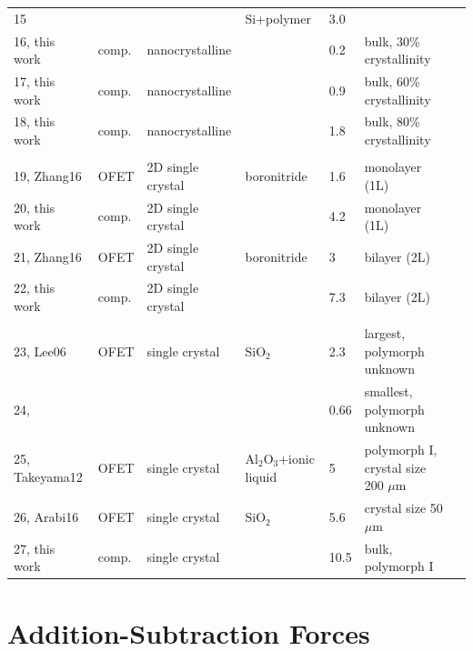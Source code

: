 \begin{table}[h!]
\begin{center}
\begin{tabular}{lllllll}
			15                  &       &                         & Si+polymer   &  3.0   &         \\
			16,  this work &   comp.        & nanocrystalline &  & 0.2 & bulk, 30\% crystallinity \\
			17,  this work &   comp.        & nanocrystalline &  & 0.9 & bulk,  60\% crystallinity \\
			18,  this work &   comp.       & nanocrystalline &  & 1.8 & bulk, 80\% crystallinity \\
			\hline \\
			19,   Zhang16 & OFET & 2D single crystal & boronitride &  1.6 & monolayer (1L)  \\
			20,  this work &   comp.        & 2D single crystal &   & 4.2 & monolayer (1L) \\
			21,  Zhang16 & OFET & 2D single crystal & boronitride &  3 & bilayer (2L)  \\
			22,  this work &   comp.        & 2D single crystal &   & 7.3  & bilayer (2L) \\
			\hline \\
			23, Lee06 & OFET & single crystal & SiO$_2$ & 2.3 & largest, polymorph unknown \\
			24, &  &  & & 0.66 & smallest, polymorph unknown \\
			25, Takeyama12 & OFET & single crystal & Al$_2$O$_3$+ionic liquid & 5 & polymorph I, crystal size 200 $\mu$m \\
			26,  Arabi16 & OFET &  single crystal & SiO$_2$ & 5.6 & crystal size 50 $\mu$m \\
			27,  this work &   comp.        &  single crystal &   & 10.5 & bulk, polymorph I \\
		\end{tabular}
	\end{center}
\end{table}

\chapter{Addition-Subtraction Forces}
\label{ap:EwaldForcesAddSub}
